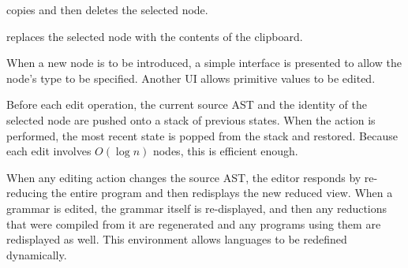  copies and then deletes the selected node.

 replaces the selected node with the contents of the clipboard.

When a new node is to be introduced, a simple interface is presented to allow the node's type to be specified. Another UI allows primitive values to be edited.

Before each edit operation, the current source AST and the identity of the selected node are pushed onto a stack of previous states. When the  action is performed, the most recent state is popped from the stack and restored. Because each edit involves $O(\log n)$ nodes, this is efficient enough.

When any editing action changes the source AST, the editor responds by re-reducing the entire program and then redisplays the new reduced view. When a grammar is edited, the grammar itself is re-displayed, and then any reductions that were compiled from it are regenerated and any programs using them are redisplayed as well. This environment allows languages to be redefined dynamically.


